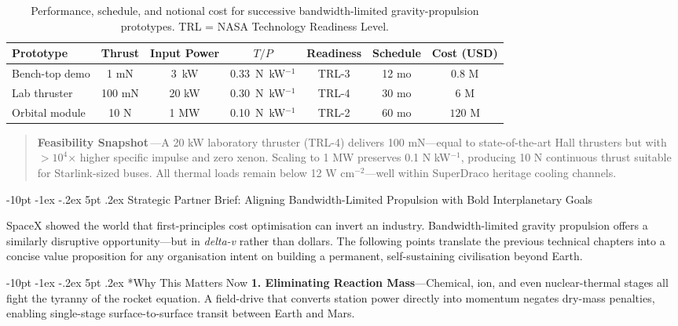 \documentclass[12pt,letterpaper]{book}
\makeatletter
\renewcommand\section{\@startsection{section}{1}{\z@}%
  {-8pt \@plus -1ex \@minus -.2ex}%
  {4pt \@plus.2ex}%
  {\normalfont\large\bfseries}}
\renewcommand\section{\@startsection {section}{1}{\z@}%
                {-10pt \@plus -1ex \@minus -.2ex}%
                {5pt \@plus.2ex}%
                {\normalfont\large\bfseries}}
\makeatother
\begin{document}
\begin{table}[h!]
\centering
\begin{tabular}{@{}lcccccc@{}}
\toprule
Prototype & Thrust & Input Power & $T/P$ & Readiness & Schedule & Cost (USD) \\
\midrule
Bench-top demo & 1 mN & 3~kW & 0.33~N~kW$^{-1}$ & TRL-3 & 12 mo & $0.8$ M \\
Lab thruster & 100 mN & 20 kW & 0.30~N~kW$^{-1}$ & TRL-4 & 30 mo & $6$ M \\
Orbital module & 10 N & 1 MW & 0.10~N~kW$^{-1}$ & TRL-2 & 60 mo & $120$ M \\
\bottomrule
\end{tabular}
\caption{Performance, schedule, and notional cost for successive bandwidth-limited gravity-propulsion prototypes.  TRL = NASA Technology Readiness Level.}
\end{table}

\begin{quote}\small
\textbf{Feasibility Snapshot}\,—A 20 kW laboratory thruster (TRL-4) delivers 100 mN—equal to state-of-the-art Hall thrusters but with $>10^{4}$× higher specific impulse and zero xenon.  Scaling to 1 MW preserves 0.1 N kW$^{-1}$, producing 10 N continuous thrust suitable for Starlink-sized buses.  All thermal loads remain below 12 W cm$^{-2}$—well within SuperDraco heritage cooling channels.
\end{quote}

\section{Strategic Partner Brief: Aligning Bandwidth-Limited Propulsion with Bold Interplanetary Goals}

SpaceX showed the world that first-principles cost optimisation can invert an industry.  Bandwidth-limited gravity propulsion offers a similarly disruptive opportunity—but in \emph{delta-v} rather than dollars.  The following points translate the previous technical chapters into a concise value proposition for any organisation intent on building a permanent, self-sustaining civilisation beyond Earth.

\section*{Why This Matters Now}
\textbf{1. Eliminating Reaction Mass}\;—Chemical, ion, and even nuclear-thermal stages all fight the tyranny of the rocket equation.  A field-drive that converts station power directly into momentum negates dry-mass penalties, enabling single-stage surface-to-surface transit between Earth and Mars.
\end{document}
